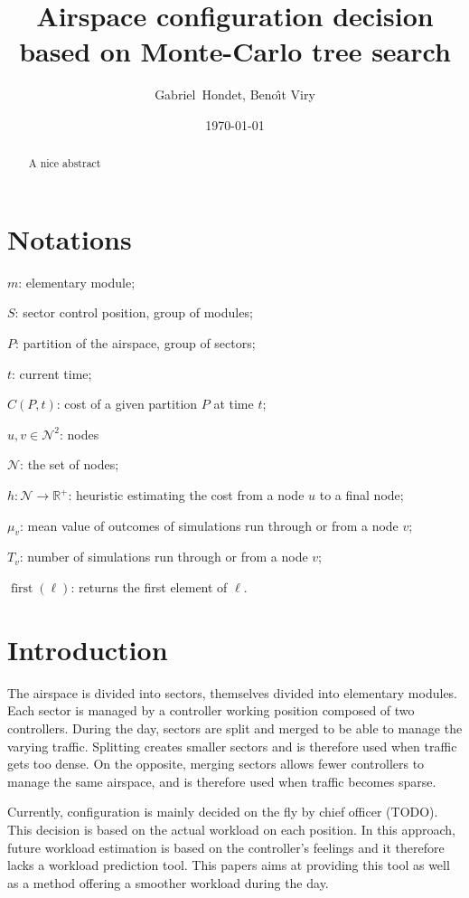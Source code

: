 \documentclass[oneside,twocolumn]{article}
\title{Airspace configuration decision based on Monte-Carlo tree search}
\author{Gabriel~Hondet, Beno\^{\i}t Viry}
\date{\today}
\DeclareMathOperator{\first}{first}
\begin{document}
\maketitle

\begin{abstract}
  A nice abstract
\end{abstract}


\section*{Notations}
\begin{compactitem}
  \item $m$: elementary module;
  \item $S$: sector control position, group of modules;
  \item $P$: partition of the airspace, group of sectors;
  \item $t$: current time;
  \item $C(P, t)$: cost of a given partition $P$ at time $t$;
  \item \(u, v \in \mathcal{N}^2\): nodes
  \item \(\mathcal{N}\): the set of nodes;
  \item $h \colon \mathcal{N} \to \mathbb{R}^+$: heuristic estimating the cost
    from a node \(u\) to a final node;
  \item \(\mu_v\): mean value of outcomes of simulations run through or from a
    node \(v\);
  \item \(T_v\): number of simulations run through or from a node \(v\);
  \item \(\first(\ell)\): returns the first element of \(\ell\).
\end{compactitem}

\section{Introduction}
The airspace is divided into sectors, themselves divided into elementary
modules. Each sector is managed by a controller working position composed of two
controllers.
During the day, sectors are split and merged to be able to
manage the varying traffic. Splitting creates smaller sectors and is therefore
used when traffic gets too dense. On the opposite, merging sectors allows fewer
controllers to manage the same airspace, and is therefore used when traffic
becomes sparse.

Currently, configuration is mainly decided on the fly by chief officer (TODO).
This decision is based on the actual workload on each position. In this
approach, future workload estimation is based on the controller's feelings and
it therefore lacks a workload prediction tool.
This papers aims at providing this tool as well as a method offering a smoother
workload during the day.
\end{document}
